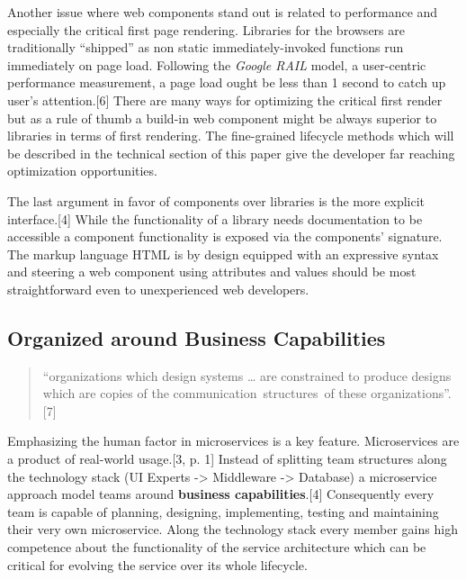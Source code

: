 \documentclass[]{article}
\begin{document}
Another issue where web components stand out is related to performance
and especially the critical first page rendering. Libraries for the
browsers are traditionally ``shipped'' as non static immediately-invoked
functions run immediately on page load. Following the \emph{Google RAIL}
model, a user-centric performance measurement, a page load ought be less
than 1 second to catch up user's attention.{[}6{]} There are many ways
for optimizing the critical first render but as a rule of thumb a
build-in web component might be always superior to libraries in terms of
first rendering. The fine-grained lifecycle methods which will be
described in the technical section of this paper give the developer far
reaching optimization opportunities.

The last argument in favor of components over libraries is the more
explicit interface.{[}4{]} While the functionality of a library needs
documentation to be accessible a component functionality is exposed via
the components' signature. The markup language HTML is by design
equipped with an expressive syntax and steering a web component using
attributes and values should be most straightforward even to
unexperienced web developers.

\subsection{Organized around Business
Capabilities}\label{organized-around-business-capabilities}

\begin{quote}
``organizations which design systems \ldots{} are constrained to produce
designs which are copies of the communication~structures~of these
organizations''. {[}7{]}
\end{quote}

Emphasizing the human factor in microservices is a key feature.
Microservices are a product of real-world usage.{[}3, p. 1{]} Instead of
splitting team structures along the technology stack (UI Experts
-\textgreater{} Middleware -\textgreater{} Database) a microservice
approach model teams around \textbf{business capabilities}.{[}4{]}
Consequently every team is capable of planning, designing, implementing,
testing and maintaining their very own microservice. Along the
technology stack every member gains high competence about the
functionality of the service architecture which can be critical for
evolving the service over its whole lifecycle.
\end{document}
